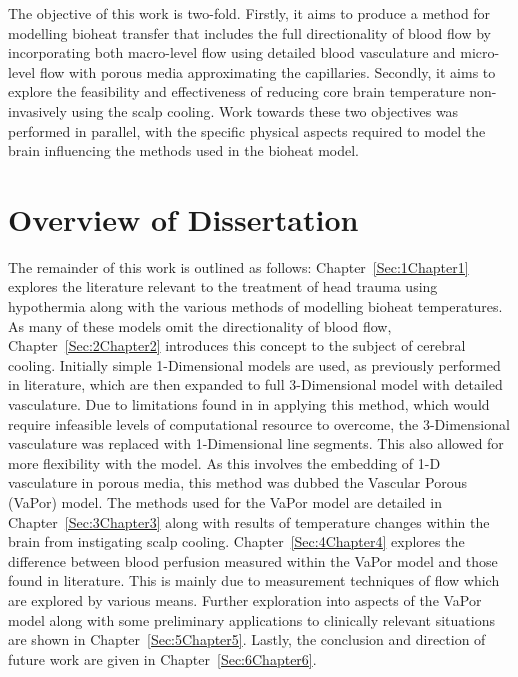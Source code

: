 \documentclass[11pt,english,a4paper,twoside,openright]{report}
\begin{document}
{{{{{{{{	The objective of this work is two-fold. Firstly, it aims to produce a method for modelling bioheat transfer that includes the full directionality of blood flow by incorporating both macro-level flow using detailed blood vasculature and micro-level flow with porous media approximating the capillaries. Secondly, it aims to explore the feasibility and effectiveness of reducing core brain temperature non-invasively using the scalp cooling. Work towards these two objectives was performed in parallel, with the specific physical aspects required to model the brain influencing the methods used in the bioheat model. 
	
	\section[Overview of Dissertation]{{\Large O}verview of {\Large D}issertation}
	
	The remainder of this work is outlined as follows: Chapter~\ref{Sec:1Chapter1} explores the literature relevant to the treatment of head trauma using hypothermia along with the various methods of modelling bioheat temperatures. As many of these models omit the directionality of blood flow, Chapter~\ref{Sec:2Chapter2} introduces this concept to the subject of cerebral cooling. Initially simple 1-Dimensional models are used, as previously performed in literature, which are then expanded to full 3-Dimensional model with detailed vasculature. Due to limitations found in in applying this method, which would require infeasible levels of computational resource to overcome, the 3-Dimensional vasculature was replaced with 1-Dimensional line segments. This also allowed for more flexibility with the model. As this involves the embedding of 1-D vasculature in porous media, this method was dubbed the Vascular Porous (VaPor) model. The methods used for the VaPor model are detailed in Chapter~\ref{Sec:3Chapter3} along with results of temperature changes within the brain from instigating scalp cooling. Chapter~\ref{Sec:4Chapter4} explores the difference between blood perfusion measured within the VaPor model and those found in literature. This is mainly due to measurement techniques of flow which are explored by various means. Further exploration into aspects of the VaPor model along with some preliminary applications to clinically relevant situations are shown in Chapter~\ref{Sec:5Chapter5}. Lastly, the conclusion and direction of future work are given in Chapter~\ref{Sec:6Chapter6}.
	
}}}}}}}}
\end{document}
